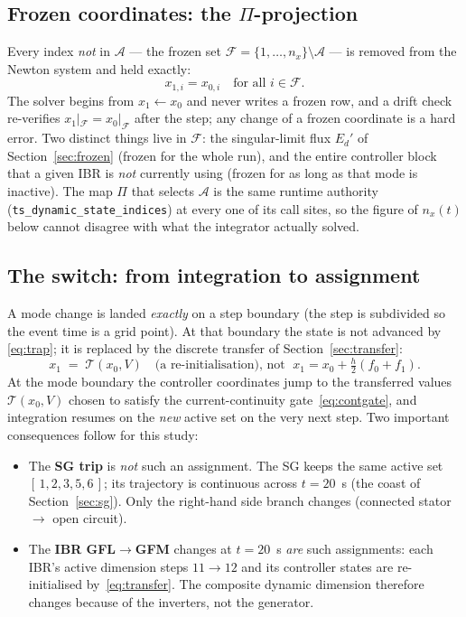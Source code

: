 \documentclass[12pt,a4paper]{article}
\begin{document}
\subsection{Frozen coordinates: the $\Pi$-projection}\label{sec:ts-frozen}
Every index \emph{not} in $\mathcal{A}$ --- the frozen set
$\mathcal{F}=\{1,\dots,n_x\}\setminus\mathcal{A}$ --- is removed from the Newton
system and held exactly:
\begin{equation}
  x_{1,i}=x_{0,i}\quad\text{for all }i\in\mathcal{F}.
  \label{eq:frozen}
\end{equation}
The solver begins from $x_1\!\leftarrow\!x_0$ and never writes a frozen row, and a
drift check re-verifies $x_{1}|_{\mathcal F}=x_{0}|_{\mathcal F}$ after the step;
any change of a frozen coordinate is a hard error. Two distinct things live in
$\mathcal{F}$: the singular-limit flux $E_d'$ of Section~\ref{sec:frozen} (frozen
for the whole run), and the entire controller block that a given IBR is
\emph{not} currently using (frozen for as long as that mode is inactive). The map
$\Pi$ that selects $\mathcal{A}$ is the same runtime authority
(\texttt{ts\_dynamic\_state\_indices}) at every one of its call sites, so the
figure of $n_x(t)$ below cannot disagree with what the integrator actually
solved.

\subsection{The switch: from integration to assignment}\label{sec:ts-switch}
A mode change is landed \emph{exactly} on a step boundary (the step is subdivided
so the event time is a grid point). At that boundary the state is not advanced by
\eqref{eq:trap}; it is replaced by the discrete transfer of
Section~\ref{sec:transfer}:
\begin{equation}
  x_1 \;=\; \mathcal{T}(x_0,V)\quad\text{(a re-initialisation), not }
  \;x_1=x_0+\tfrac{h}{2}(f_0+f_1).
  \label{eq:assign}
\end{equation}
At the mode boundary the controller coordinates jump to the transferred values
$\mathcal T(x_0,V)$ chosen to satisfy the current-continuity
gate~\eqref{eq:contgate}, and integration resumes on the \emph{new} active set on
the very next step. Two important consequences follow for this study:
\begin{itemize}\itemsep2pt
  \item The \textbf{SG trip} is \emph{not} such an assignment. The SG keeps the
        same active set $[\,1,2,3,5,6\,]$; its trajectory is continuous across
        $t=20$~s (the coast of Section~\ref{sec:sg}). Only the right-hand side
        branch changes (connected stator $\to$ open circuit).
  \item The \textbf{IBR GFL$\to$GFM} changes at $t=20$~s \emph{are} such
        assignments: each IBR's active dimension steps $11\to12$ and its
        controller states are re-initialised by~\eqref{eq:transfer}. The
        composite dynamic dimension therefore changes because of the inverters,
        not the generator.
\end{itemize}
\end{document}
